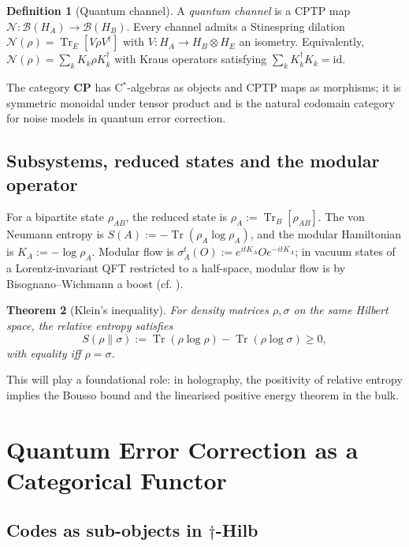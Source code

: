 \documentclass[12pt]{article}
\newtheorem{theorem}{Theorem}[section]
\theoremstyle{definition}
\newtheorem{definition}[theorem]{Definition}
\theoremstyle{remark}
\newcommand{\CP}{\mathbf{CP}}
\newcommand{\Tr}{\operatorname{Tr}}
\newcommand{\id}{\mathrm{id}}
\begin{document}
\begin{definition}[Quantum channel]
A \emph{quantum channel} is a CPTP map $\mathcal{N}\colon \mathcal{B}(H_A) \to \mathcal{B}(H_B)$. Every channel admits a Stinespring dilation $\mathcal{N}(\rho) = \Tr_E[V\rho V^\dagger]$ with $V\colon H_A \to H_B \otimes H_E$ an isometry. Equivalently, $\mathcal{N}(\rho) = \sum_k K_k \rho K_k^\dagger$ with Kraus operators satisfying $\sum_k K_k^\dagger K_k = \id$.
\end{definition}

The category $\CP$ has C$^*$-algebras as objects and CPTP maps as morphisms; it is symmetric monoidal under tensor product and is the natural codomain category for noise models in quantum error correction.

\subsection{Subsystems, reduced states and the modular operator}

For a bipartite state $\rho_{AB}$, the reduced state is $\rho_A := \Tr_B[\rho_{AB}]$. The von Neumann entropy is $S(A) := -\Tr(\rho_A \log \rho_A)$, and the modular Hamiltonian is $K_A := -\log \rho_A$. Modular flow is $\sigma_A^t(O) := e^{itK_A} O e^{-itK_A}$; in vacuum states of a Lorentz-invariant QFT restricted to a half-space, modular flow is by Bisognano--Wichmann a boost (cf. \cite{bisognano1976}).

\begin{theorem}[Klein's inequality]
\label{thm:klein}
For density matrices $\rho,\sigma$ on the same Hilbert space, the relative entropy satisfies
\[
S(\rho \| \sigma) := \Tr(\rho \log \rho) - \Tr(\rho \log \sigma) \geq 0,
\]
with equality iff $\rho = \sigma$.
\end{theorem}

This will play a foundational role: in holography, the positivity of relative entropy implies the Bousso bound and the linearised positive energy theorem in the bulk.

\section{Quantum Error Correction as a Categorical Functor}
\label{sec:qec-functor}

\subsection[Codes as sub-objects in dagger-Hilb]{Codes as sub-objects in $\dagger$-Hilb}
\end{document}
